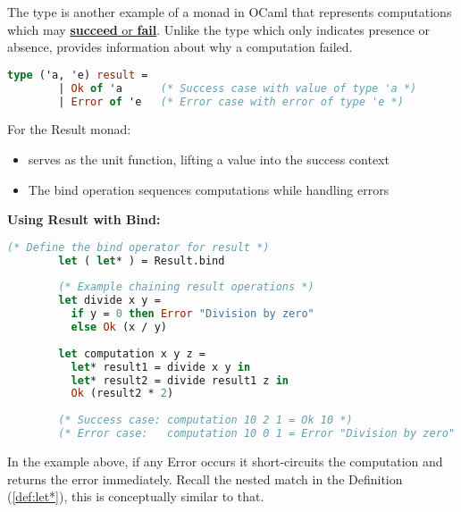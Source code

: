     \newpage 

    \begin{Def}
        
        The  type is another example of a monad in OCaml that represents computations which may \underline{\textbf{succeed} or \textbf{fail}}. Unlike the  type which only indicates presence or absence,  provides information about why a computation failed.
        
        \begin{lstlisting}[language=OCaml, caption={Result Type in OCaml}, numbers=none]
        type ('a, 'e) result = 
        | Ok of 'a      (* Success case with value of type 'a *)
        | Error of 'e   (* Error case with error of type 'e *)
        \end{lstlisting}
        
        \noindent
        For the Result monad:
        \begin{itemize}
            \item {} serves as the unit function, lifting a value into the success context
            \item The bind operation sequences computations while handling errors
        \end{itemize}
        
        \noindent
        \textbf{Using Result with Bind:}
        
        \begin{lstlisting}[language=OCaml, numbers=none]
        (* Define the bind operator for result *)
        let ( let* ) = Result.bind
        
        (* Example chaining result operations *)
        let divide x y =
          if y = 0 then Error "Division by zero"
          else Ok (x / y)
        
        let computation x y z =
          let* result1 = divide x y in
          let* result2 = divide result1 z in
          Ok (result2 * 2)
        
        (* Success case: computation 10 2 1 = Ok 10 *)
        (* Error case:   computation 10 0 1 = Error "Division by zero" *)
        \end{lstlisting}
        
        \noindent
        In the example above, if any Error occurs it short-circuits the computation and returns the error immediately.
        Recall the nested match in the  Definition (\ref{def:let*}), this is conceptually similar to that.

    \end{Def}

